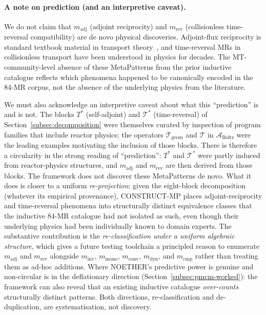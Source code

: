 \documentclass[acmsmall, screen]{acmart}
\begin{document}
\paragraph{A note on prediction (and an interpretive caveat).} We do not claim that $m_{\mathrm{adj}}$ (adjoint reciprocity) and $m_{\mathrm{rev}}$ (collisionless time-reversal compatibility) are de novo physical discoveries. Adjoint-flux reciprocity is standard textbook material in transport theory~\cite{BellGlasstone1970, LewisMiller1993}, and time-reversal MRs in collisionless transport have been understood in physics for decades. The MT-community-level absence of these MetaPatterns from the prior inductive catalogue reflects which phenomena happened to be canonically encoded in the 84-MR corpus, not the absence of the underlying physics from the literature.

We must also acknowledge an interpretive caveat about what this ``prediction'' is and is not. The blocks $T^{*}$ (self-adjoint) and $\mathcal{T}^{*}$ (time-reversal) of Section~\ref{subsec:decomposition} were themselves curated by inspection of program families that include reactor physics; the operators $\mathcal{T}_{\mathrm{geom}}$ and $\mathcal{T}$ in $\mathcal{A}_{\mathrm{Boltz}}$ were the leading examples motivating the inclusion of those blocks. There is therefore a circularity in the strong reading of ``prediction'': $T^{*}$ and $\mathcal{T}^{*}$ were partly induced from reactor-physics structures, and $m_{\mathrm{adj}}$ and $m_{\mathrm{rev}}$ are then derived from those blocks. The framework does not discover these MetaPatterns de novo. What it does is closer to a uniform \emph{re-projection}: given the eight-block decomposition (whatever its empirical provenance), CONSTRUCT-MP places adjoint-reciprocity and time-reversal phenomena into structurally distinct equivalence classes that the inductive 84-MR catalogue had not isolated as such, even though their underlying physics had been individually known to domain experts. The substantive contribution is the \emph{re-classification under a uniform algebraic structure}, which gives a future testing toolchain a principled reason to enumerate $m_{\mathrm{adj}}$ and $m_{\mathrm{rev}}$ alongside $m_{\mathrm{inv}}$, $m_{\mathrm{mono}}$, $m_{\mathrm{conv}}$, $m_{\mathrm{dyn}}$, and $m_{\mathrm{cmp}}$ rather than treating them as ad-hoc additions. Where NOETHER's predictive power is genuine and non-circular is in the deflationary direction (Section~\ref{subsec:pmcm-worked}): the framework can also reveal that an existing inductive catalogue \emph{over-counts} structurally distinct patterns. Both directions, re-classification and de-duplication, are systematisation, not discovery.
\end{document}
